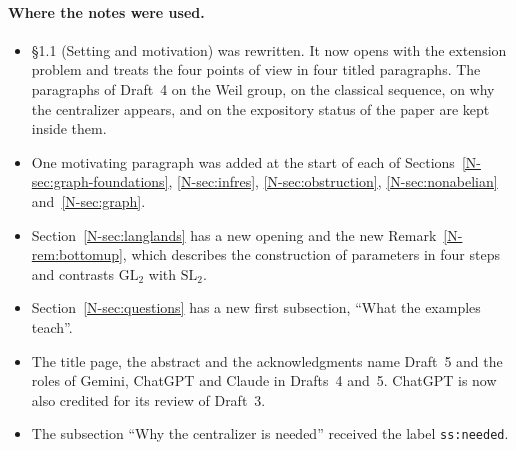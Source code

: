 \documentclass[12pt,letterpaper]{article}
\begin{document}
\paragraph{Where the notes were used.}
\begin{itemize}[itemsep=1pt]
\item \S1.1 (Setting and motivation) was rewritten. It now opens with
  the extension problem and treats the four points of view in four
  titled paragraphs. The paragraphs of Draft~4 on the Weil group, on the
  classical sequence, on why the centralizer appears, and on the
  expository status of the paper are kept inside them.
\item One motivating paragraph was added at the start of each of
  Sections~\ref{N-sec:graph-foundations}, \ref{N-sec:infres},
  \ref{N-sec:obstruction}, \ref{N-sec:nonabelian} and~\ref{N-sec:graph}.
\item Section~\ref{N-sec:langlands} has a new opening and the new
  Remark~\ref{N-rem:bottomup}, which describes the construction of
  parameters in four steps and contrasts $\mathrm{GL}_2$ with
  $\mathrm{SL}_2$.
\item Section~\ref{N-sec:questions} has a new first subsection, ``What
  the examples teach''.
\item The title page, the abstract and the acknowledgments name
  Draft~5 and the roles of Gemini, ChatGPT and Claude in Drafts~4
  and~5. ChatGPT is now also credited for its review of Draft~3.
\item The subsection ``Why the centralizer is needed'' received the
  label \texttt{ss:needed}.
\end{itemize}
\end{document}
